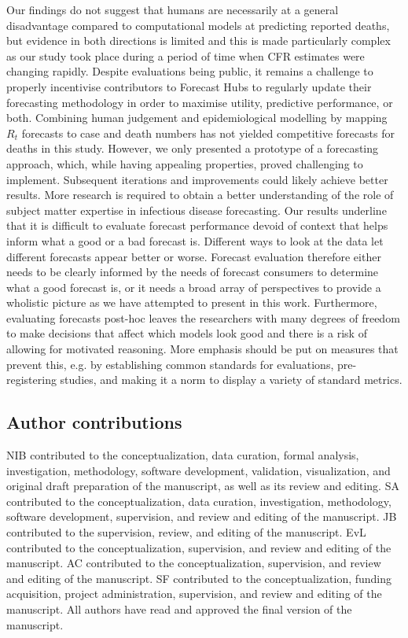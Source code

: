 \documentclass[10pt,a4paper,twocolumn]{article}
\begin{document}
Our findings do not suggest that humans are necessarily at a general disadvantage compared to computational models at predicting reported deaths, but evidence in both directions is limited and this is made particularly complex as our study took place during a period of time when CFR estimates were changing rapidly. Despite evaluations being public, it remains a challenge to properly incentivise contributors to Forecast Hubs to regularly update their forecasting methodology in order to maximise utility, predictive performance, or both. Combining human judgement and epidemiological modelling by mapping $R_t$ forecasts to case and death numbers has not yielded competitive forecasts for deaths in this study. However, we only presented a prototype of a forecasting approach, which, while having appealing properties, proved challenging to implement. Subsequent iterations and improvements could likely achieve better results. More research is required to obtain a better understanding of the role of subject matter expertise in infectious disease forecasting. Our results underline that it is difficult to evaluate forecast performance devoid of context that helps inform what a good or a bad forecast is. Different ways to look at the data let different forecasts appear better or worse. Forecast evaluation therefore either needs to be clearly informed by the needs of forecast consumers to determine what a good forecast is, or it needs a broad array of perspectives to provide a wholistic picture as we have attempted to present in this work. Furthermore, evaluating forecasts post-hoc leaves the researchers with many degrees of freedom to make decisions that affect which models look good and there is a risk of allowing for motivated reasoning. More emphasis should be put on measures that prevent this, e.g. by establishing common standards for evaluations, pre-registering studies, and making it a norm to display a variety of standard metrics. 








\subsection*{Author contributions}
NIB contributed to the conceptualization, data curation, formal analysis, investigation, methodology, software development, validation, visualization, and original draft preparation of the manuscript, as well as its review and editing.
SA contributed to the conceptualization, data curation, investigation, methodology, software development, supervision, and review and editing of the manuscript.
JB contributed to the supervision, review, and editing of the manuscript.
EvL contributed to the conceptualization, supervision, and review and editing of the manuscript.
AC contributed to the conceptualization, supervision, and review and editing of the manuscript.
SF contributed to the conceptualization, funding acquisition, project administration, supervision, and review and editing of the manuscript.
All authors have read and approved the final version of the manuscript.
\end{document}
